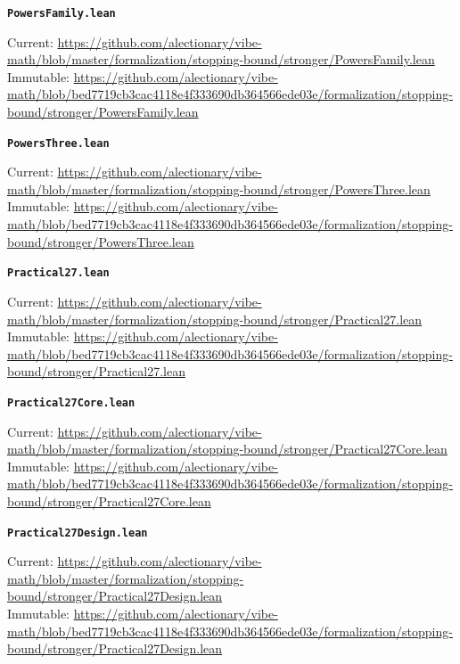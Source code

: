 \smallskip
\medskip
\par\noindent\textbf{\texttt{PowersFamily.lean}}\par\nopagebreak
{\footnotesize\noindent Current: \url{https://github.com/alectionary/vibe-math/blob/master/formalization/stopping-bound/stronger/PowersFamily.lean}\\
Immutable: \url{https://github.com/alectionary/vibe-math/blob/bed7719cb3cac4118e4f333690db364566ede03e/formalization/stopping-bound/stronger/PowersFamily.lean}\par}
\smallskip
\medskip
\par\noindent\textbf{\texttt{PowersThree.lean}}\par\nopagebreak
{\footnotesize\noindent Current: \url{https://github.com/alectionary/vibe-math/blob/master/formalization/stopping-bound/stronger/PowersThree.lean}\\
Immutable: \url{https://github.com/alectionary/vibe-math/blob/bed7719cb3cac4118e4f333690db364566ede03e/formalization/stopping-bound/stronger/PowersThree.lean}\par}
\smallskip
\medskip
\par\noindent\textbf{\texttt{Practical27.lean}}\par\nopagebreak
{\footnotesize\noindent Current: \url{https://github.com/alectionary/vibe-math/blob/master/formalization/stopping-bound/stronger/Practical27.lean}\\
Immutable: \url{https://github.com/alectionary/vibe-math/blob/bed7719cb3cac4118e4f333690db364566ede03e/formalization/stopping-bound/stronger/Practical27.lean}\par}
\smallskip
\medskip
\par\noindent\textbf{\texttt{Practical27Core.lean}}\par\nopagebreak
{\footnotesize\noindent Current: \url{https://github.com/alectionary/vibe-math/blob/master/formalization/stopping-bound/stronger/Practical27Core.lean}\\
Immutable: \url{https://github.com/alectionary/vibe-math/blob/bed7719cb3cac4118e4f333690db364566ede03e/formalization/stopping-bound/stronger/Practical27Core.lean}\par}
\smallskip
\medskip
\par\noindent\textbf{\texttt{Practical27Design.lean}}\par\nopagebreak
{\footnotesize\noindent Current: \url{https://github.com/alectionary/vibe-math/blob/master/formalization/stopping-bound/stronger/Practical27Design.lean}\\
Immutable: \url{https://github.com/alectionary/vibe-math/blob/bed7719cb3cac4118e4f333690db364566ede03e/formalization/stopping-bound/stronger/Practical27Design.lean}\par}
